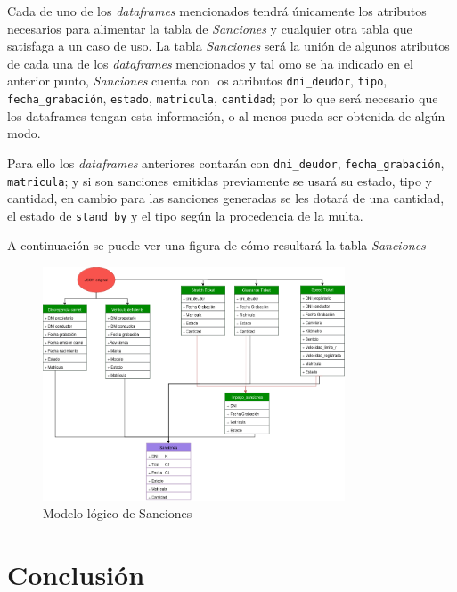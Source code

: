 \documentclass[]{article}
\begin{document}
Cada de uno de los \textit{dataframes} mencionados tendrá únicamente los atributos necesarios para alimentar la tabla de \textit{Sanciones} y cualquier otra tabla que satisfaga a un caso de uso.
La tabla \textit{Sanciones} será la unión de algunos atributos de cada una de los \textit{dataframes} mencionados y tal omo se ha indicado en el anterior punto, \textit{Sanciones} cuenta con los atributos \texttt{dni\_deudor}, \texttt{tipo}, \texttt{fecha\_grabación}, \texttt{estado}, \texttt{matricula}, \texttt{cantidad}; por lo que será necesario que los dataframes tengan esta información, o al menos pueda ser obtenida de algún modo.
\newline

Para ello los \textit{dataframes} anteriores contarán con \texttt{dni\_deudor}, \texttt{fecha\_grabación}, \texttt{matricula}; y si son sanciones emitidas previamente se usará su estado, tipo y cantidad, en cambio para las sanciones generadas se les dotará de una cantidad, el estado de \texttt{stand\_by} y el tipo según la procedencia de la multa.
\newline

A continuación se puede ver una figura de cómo resultará la tabla \textit{Sanciones}
\begin{figure}[H]
    \centering
    \includegraphics[width=0.8\textwidth]{./imagenes/Sanciones.png}
    \caption{Modelo lógico de Sanciones}
    \label{fig:modelo_sanciones}
\end{figure}


\newpage
\section{Conclusión}
\label{sec:conclusion}
\end{document}
